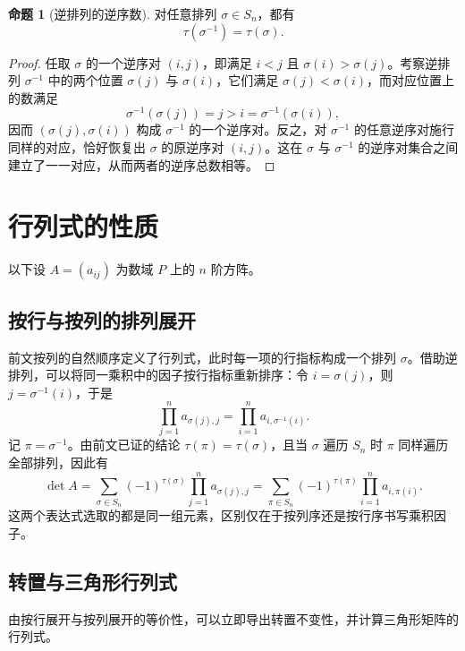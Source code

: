 \documentclass[UTF8, fontset=fandol, a4paper, 12pt]{ctexart}
\theoremstyle{definition}
\newtheorem{proposition}[theorem]{命题}
\begin{document}
\begin{proposition}[逆排列的逆序数]
对任意排列 $\sigma\in S_n$，都有
\[
 \tau(\sigma^{-1})=\tau(\sigma).
\]
\end{proposition}
\begin{proof}
任取 $\sigma$ 的一个逆序对 $(i,j)$，即满足 $i<j$ 且 $\sigma(i)>\sigma(j)$。考察逆排列 $\sigma^{-1}$ 中的两个位置 $\sigma(j)$ 与 $\sigma(i)$，它们满足 $\sigma(j)<\sigma(i)$，而对应位置上的数满足
\[
 \sigma^{-1}(\sigma(j))=j>i=\sigma^{-1}(\sigma(i)),
\]
因而 $(\sigma(j),\sigma(i))$ 构成 $\sigma^{-1}$ 的一个逆序对。反之，对 $\sigma^{-1}$ 的任意逆序对施行同样的对应，恰好恢复出 $\sigma$ 的原逆序对 $(i,j)$。这在 $\sigma$ 与 $\sigma^{-1}$ 的逆序对集合之间建立了一一对应，从而两者的逆序总数相等。
\end{proof}

\section{行列式的性质}

以下设 $A=(a_{ij})$ 为数域 $P$ 上的 $n$ 阶方阵。

\subsection{按行与按列的排列展开}

前文按列的自然顺序定义了行列式，此时每一项的行指标构成一个排列 $\sigma$。借助逆排列，可以将同一乘积中的因子按行指标重新排序：令 $i=\sigma(j)$，则 $j=\sigma^{-1}(i)$，于是
\[
 \prod_{j=1}^n a_{\sigma(j),j}
 =\prod_{i=1}^n a_{i,\sigma^{-1}(i)}.
\]
记 $\pi=\sigma^{-1}$。由前文已证的结论 $\tau(\pi)=\tau(\sigma)$，且当 $\sigma$ 遍历 $S_n$ 时 $\pi$ 同样遍历全部排列，因此有
\[
 \det A
 =\sum_{\sigma\in S_n}(-1)^{\tau(\sigma)}\prod_{j=1}^n a_{\sigma(j),j}
 =\sum_{\pi\in S_n}(-1)^{\tau(\pi)}\prod_{i=1}^n a_{i,\pi(i)}.
\]
这两个表达式选取的都是同一组元素，区别仅在于按列序还是按行序书写乘积因子。

\subsection{转置与三角形行列式}

由按行展开与按列展开的等价性，可以立即导出转置不变性，并计算三角形矩阵的行列式。
\end{document}

